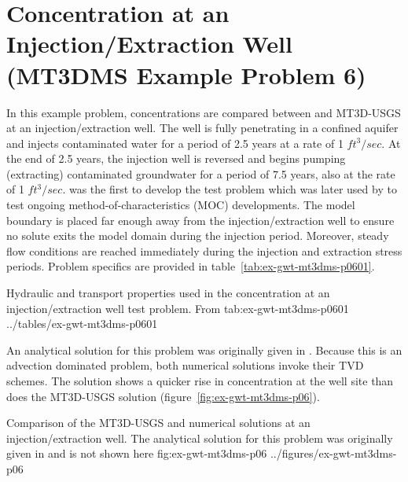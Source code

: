 \section{Concentration at an Injection/Extraction Well (MT3DMS Example Problem 6)}

In this example problem, concentrations are compared between \mf and MT3D-USGS at an injection/extraction well. The well is fully penetrating in a confined aquifer and injects contaminated water for a period of 2.5 years at a rate of 1 $ft^3/sec$.  At the end of 2.5 years, the injection well is reversed and begins pumping (extracting) contaminated groundwater for a period of 7.5 years, also at the rate of 1 $ft^3/sec$.  \cite{elkadi1988} was the first to develop the test problem which was later used by \cite{zheng1993} to test ongoing method-of-characteristics (MOC) developments.  The model boundary is placed far enough away from the injection/extraction well to ensure no solute exits the model domain during the injection period.  Moreover, steady flow conditions are reached immediately during the injection and extraction stress periods.  Problem specifics are provided in table~\ref{tab:ex-gwt-mt3dms-p0601}.

\begin{StandardTable}
	{Hydraulic and transport properties used in the concentration at an injection/extraction well test problem.  From \cite{zheng1999mt3dms}}
	{tab:ex-gwt-mt3dms-p0601}
	{../tables/ex-gwt-mt3dms-p0601}
\end{StandardTable}

An analytical solution for this problem was originally given in \cite{gelhar1971}.  Because this is an advection dominated problem, both numerical solutions invoke their TVD schemes.  The \mf solution shows a quicker rise in concentration at the well site than does the MT3D-USGS solution (figure~\ref{fig:ex-gwt-mt3dms-p06}). 

\begin{StandardFigure}
	{Comparison of the MT3D-USGS and \mf numerical solutions at an injection/extraction well. The analytical solution for this problem was originally given in \citep{gelhar1971} and is not shown here} 
	{fig:ex-gwt-mt3dms-p06}
	{../figures/ex-gwt-mt3dms-p06}
\end{StandardFigure}

